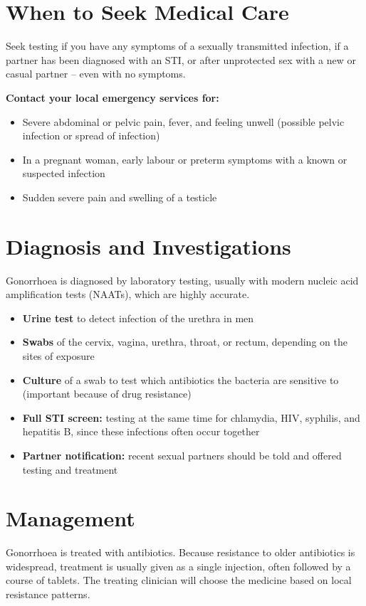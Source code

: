 \section*{When to Seek Medical Care}
Seek testing if you have any symptoms of a sexually transmitted infection, if a partner has been diagnosed with an STI, or after unprotected sex with a new or casual partner -- even with no symptoms.

\textbf{Contact your local emergency services for:}
\begin{itemize}
    \item Severe abdominal or pelvic pain, fever, and feeling unwell (possible pelvic infection or spread of infection)
    \item In a pregnant woman, early labour or preterm symptoms with a known or suspected infection
    \item Sudden severe pain and swelling of a testicle
\end{itemize}

\section*{Diagnosis and Investigations}
Gonorrhoea is diagnosed by laboratory testing, usually with modern nucleic acid amplification tests (NAATs), which are highly accurate.

\begin{itemize}
    \item \textbf{Urine test} to detect infection of the urethra in men
    \item \textbf{Swabs} of the cervix, vagina, urethra, throat, or rectum, depending on the sites of exposure
    \item \textbf{Culture} of a swab to test which antibiotics the bacteria are sensitive to (important because of drug resistance)
    \item \textbf{Full STI screen:} testing at the same time for chlamydia, HIV, syphilis, and hepatitis B, since these infections often occur together
    \item \textbf{Partner notification:} recent sexual partners should be told and offered testing and treatment
\end{itemize}

\section*{Management}
Gonorrhoea is treated with antibiotics. Because resistance to older antibiotics is widespread, treatment is usually given as a single injection, often followed by a course of tablets. The treating clinician will choose the medicine based on local resistance patterns.

